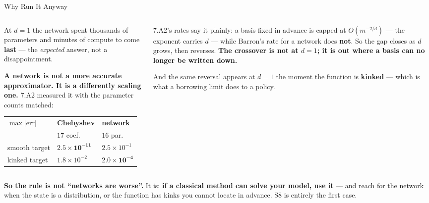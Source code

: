\begin{frame}{Why Run It Anyway}
\begin{columns}[T]
\begin{column}{0.52\textwidth}
\small
At $d=1$ the network spent thousands of parameters and minutes of compute to come \textbf{last} --- the \emph{expected} answer, not a disappointment.
\smallskip

\textbf{A network is not a more accurate approximator. It is a differently scaling one.} 7.A2 measured it with the parameter counts matched:
\smallskip

\begin{center}\footnotesize
\begin{tabularx}{\linewidth}{@{}>{\raggedright\arraybackslash}X >{\raggedleft\arraybackslash}p{1.9cm} >{\raggedleft\arraybackslash}p{1.9cm}@{}}
\toprule
$\max|\text{err}|$ & \textbf{Chebyshev} & \textbf{network} \\
 & $17$ coef. & $16$ par. \\
\midrule
smooth target & $\mathbf{2.5\times10^{-11}}$ & $2.5\times10^{-1}$ \\
kinked target & $1.8\times10^{-2}$ & $\mathbf{2.0\times10^{-4}}$ \\
\bottomrule
\end{tabularx}
\end{center}
\end{column}
\begin{column}{0.45\textwidth}
\begin{conceptbox}[title=\textbf{Where the crossover is}]\footnotesize
7.A2's rates say it plainly: a basis fixed in advance is capped at $O(m^{-2/d})$ --- the exponent carries $d$ --- while Barron's rate for a network does \textbf{not}.
\medskip
So the gap closes as $d$ grows, then reverses. \textbf{The crossover is not at $d=1$; it is out where a basis can no longer be written down.}
\end{conceptbox}
\smallskip
{\footnotesize And the same reversal appears at $d=1$ the moment the function is \textbf{kinked} --- which is what a borrowing limit does to a policy.}
\end{column}
\end{columns}
\vspace{1mm}
\begin{takeawaybox}\footnotesize
\textbf{So the rule is not ``networks are worse''.} It is: \textbf{if a classical method can solve your model, use it} --- and reach for the network when the state is a distribution, or the function has kinks you cannot locate in advance. S8 is entirely the first case.
\end{takeawaybox}
\end{frame}

